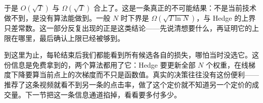 于是 \(O(\sqrt T)\) 与 \(\Omega(\sqrt T)\) 合上了。这是一条真正的不可能结果：不是当前技术做不到，是没有算法能做到。一般 \(N\) 时下界是 \(\Omega(\sqrt{T\ln N})\)，与 Hedge 的上界只差常数。这一部分反复出现的正是这类结论——先说清想要什么，再证明它的上限在哪里，最后确认上限已经被够到。

到这里为止，每轮结束后我们都能看到所有候选各自的损失，哪怕当时没选它。这份信息是免费拿到的，两个算法都用了它：Hedge 要更新全部 \(N\) 个权重，在线梯度下降要算当前点上的次梯度而不只是函数值。真实的决策往往没有这份便利——推荐了这条视频就看不到另一条的点击率，做了这个定价就不知道另一个定价的成交量。下一节把这一条信息通道掐掉，看看要多付多少。
